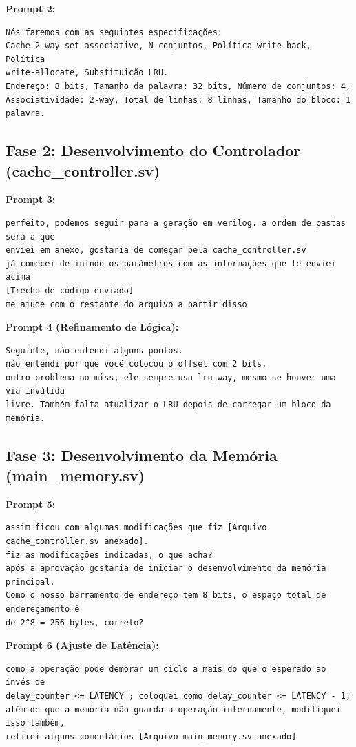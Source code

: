 ﻿\documentclass[12pt,a4paper]{article}
\begin{document}
\textbf{Prompt 2:}
\begin{verbatim}
Nós faremos com as seguintes especificações:
Cache 2-way set associative, N conjuntos, Política write-back, Política 
write-allocate, Substituição LRU.
Endereço: 8 bits, Tamanho da palavra: 32 bits, Número de conjuntos: 4, 
Associatividade: 2-way, Total de linhas: 8 linhas, Tamanho do bloco: 1 palavra.
\end{verbatim}

\subsection{Fase 2: Desenvolvimento do Controlador (cache\_controller.sv)}
\textbf{Prompt 3:}
\begin{verbatim}
perfeito, podemos seguir para a geração em verilog. a ordem de pastas será a que 
enviei em anexo, gostaria de começar pela cache_controller.sv
já comecei definindo os parâmetros com as informações que te enviei acima
[Trecho de código enviado]
me ajude com o restante do arquivo a partir disso
\end{verbatim}

\textbf{Prompt 4 (Refinamento de Lógica):}
\begin{verbatim}
Seguinte, não entendi alguns pontos.
não entendi por que você colocou o offset com 2 bits.
outro problema no miss, ele sempre usa lru_way, mesmo se houver uma via inválida 
livre. Também falta atualizar o LRU depois de carregar um bloco da memória.
\end{verbatim}

\subsection{Fase 3: Desenvolvimento da Memória (main\_memory.sv)}
\textbf{Prompt 5:}
\begin{verbatim}
assim ficou com algumas modificações que fiz [Arquivo cache_controller.sv anexado].
fiz as modificações indicadas, o que acha? 
após a aprovação gostaria de iniciar o desenvolvimento da memória principal.
Como o nosso barramento de endereço tem 8 bits, o espaço total de endereçamento é 
de 2^8 = 256 bytes, correto?
\end{verbatim}

\textbf{Prompt 6 (Ajuste de Latência):}
\begin{verbatim}
como a operação pode demorar um ciclo a mais do que o esperado ao invés de 
delay_counter <= LATENCY ; coloquei como delay_counter <= LATENCY - 1;
além de que a memória não guarda a operação internamente, modifiquei isso também, 
retirei alguns comentários [Arquivo main_memory.sv anexado]
\end{verbatim}
\end{document}
